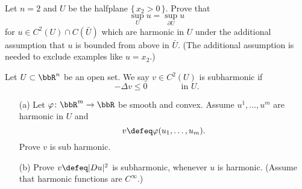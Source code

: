 \begin{problem}
  Let \(n=2\) and \(U\) be the halfplane \(\{\,x_2>0\,\}\). Prove that
  \[
    \sup_U u=\sup_{\partial U}u
  \]
  for \(u\in C^2(U)\cap C(\bar U)\) which are harmonic in \(U\) under the
  additional assumption that \(u\) is bounded from above in \(\bar
  U\). (The additional assumption is needed to exclude examples like
  \(u=x_2\).)

\end{problem}
\begin{solution}
\end{solution}
\newpage

\begin{problem}
  Let \(U\subset\bbR^n\) be an open set. We say \(v \in C^2(U)\) is
  subharmonic if
  \[
    -\Delta v\leq 0\qquad\qquad\text{in \(U\).}
  \]
  \begin{itemize}
  \item[(a)] Let \(\varphi\colon\bbR^m\to\bbR\) be smooth and
    convex. Assume \(u^1,\dotsc,u^m\) are harmonic in \(U\) and
    \[
      v\defeq\varphi(u_1,\dotsc,u_m).
    \]
    Prove \(v\) is sub harmonic.

    \noindent
    [\emph{Hint:} Convexity for a smooth function \(\varphi(z)\) is
    equivalent to \(\sum_{j,k=1}^m\varphi_{z_j,z_k}(z)\xi_j\xi_j\geq 0\)
    for any \(\xi\in\bbR^m\).]
  \item[(b)] Prove \(v\defeq|Du|^2\) is subharmonic, whenever \(u\) is
    harmonic. (Assume that harmonic functions are \(C^\infty\).)
  \end{itemize}
\end{problem}
\begin{solution}

\end{solution}


